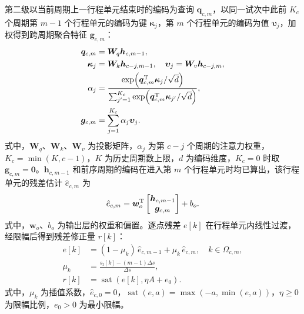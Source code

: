 \documentclass{JQR_LaTeX_Template-0507/JQRnewSubmission}
\begin{document}
第二级以当前周期上一行程单元结束时的编码为查询 $\bm q_{c,m}$，以同一试次中此前 $K_c$ 个周期第 $m-1$ 个行程单元的编码为键 $\bm\kappa_j$，第 $m$ 个行程单元的编码为值 $\bm\upsilon_j$，加权得到跨周期聚合特征 $\bm g_{c,m}$：
\begin{equation}
	\label{eq:cross-cycle}
	\begin{aligned}
		\bm q_{c,m}&=\bm W_q\bm h_{c,m-1},\\
		\bm\kappa_j&=\bm W_k\bm h_{c-j,m-1},\quad
		\bm\upsilon_j=\bm W_v\bm h_{c-j,m},\\
		\alpha_j&=\frac{\exp\!\left(\bm q_{c,m}^{\rm T}\bm\kappa_j/\sqrt d\right)}
		{\sum_{j'=1}^{K_c}\exp\!\left(\bm q_{c,m}^{\rm T}\bm\kappa_{j'}/\sqrt d\right)},\\
		\bm g_{c,m}&=\sum_{j=1}^{K_c}\alpha_j\bm\upsilon_j.
	\end{aligned}
\end{equation}
式中，$\bm W_q$、$\bm W_k$、$\bm W_v$ 为投影矩阵，$\alpha_j$ 为第 $c-j$ 个周期的注意力权重，$K_c=\min(K,c-1)$，$K$ 为历史周期数上限，$d$ 为编码维度，$K_c=0$ 时取 $\bm g_{c,m}=\bm 0$。$\bm h_{c,m-1}$ 和前序周期的编码在进入第 $m$ 个行程单元时均已算出，该行程单元的残差估计 $\hat e_{c,m}$ 为
\begin{equation}
	\label{eq:cell-output}
	\hat e_{c,m}=\bm w_o^{\rm T}
	\begin{bmatrix}\bm h_{c,m-1}\\\bm g_{c,m}\end{bmatrix}+b_o .
\end{equation}
式中，$\bm w_o$、$b_o$ 为输出层的权重和偏置。逐点残差 $e[k]$ 在行程单元内线性过渡，经限幅后得到残差修正量 $r[k]$：
\begin{equation}
	\label{eq:residual-limit}
	\begin{aligned}
		e[k]&=(1-\mu_k)\,\hat e_{c,m-1}+\mu_k\,\hat e_{c,m},\quad k\in\Omega_{c,m},\\
		\mu_k&=\frac{s_{\mathrm r}[k]-(m-1)\Delta s}{\Delta s},\\
		r[k]&=\operatorname{sat}(e[k],\eta A+e_0).
	\end{aligned}
\end{equation}
式中，$\mu_k$ 为插值系数，$\hat e_{c,0}=0$，$\operatorname{sat}(e,a)=\max(-a,\min(e,a))$，$\eta\ge0$ 为限幅比例，$e_0>0$ 为最小限幅。
\end{document}
